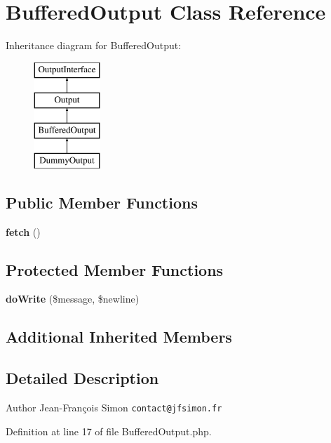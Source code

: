 \section{Buffered\+Output Class Reference}
\label{class_symfony_1_1_component_1_1_console_1_1_output_1_1_buffered_output}
Inheritance diagram for Buffered\+Output\+:\begin{figure}[H]
\begin{center}
\leavevmode
\includegraphics[height=4.000000cm]{class_symfony_1_1_component_1_1_console_1_1_output_1_1_buffered_output}
\end{center}
\end{figure}
\subsection*{Public Member Functions}
\begin{DoxyCompactItemize}
\item 
{\bf fetch} ()
\end{DoxyCompactItemize}
\subsection*{Protected Member Functions}
\begin{DoxyCompactItemize}
\item 
{\bf do\+Write} (\$message, \$newline)
\end{DoxyCompactItemize}
\subsection*{Additional Inherited Members}


\subsection{Detailed Description}
\begin{DoxyAuthor}{Author}
Jean-\/\+François Simon {\tt contact@jfsimon.\+fr} 
\end{DoxyAuthor}


Definition at line 17 of file Buffered\+Output.\+php.



